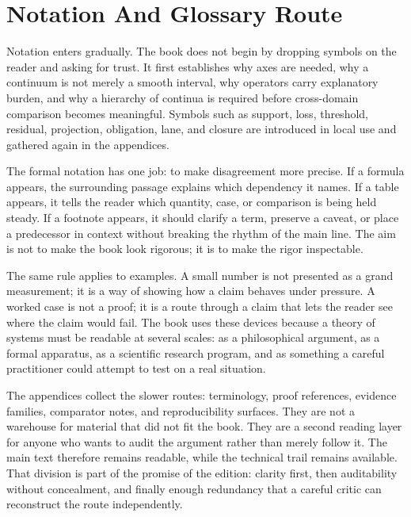 \documentclass[11pt,a4paper,openany]{book}
\begin{document}
\section*{Notation And Glossary Route}
Notation enters gradually. The book does not begin by dropping symbols on the reader and asking for trust. It first establishes why axes are needed, why a continuum is not merely a smooth interval, why operators carry explanatory burden, and why a hierarchy of continua is required before cross-domain comparison becomes meaningful. Symbols such as support, loss, threshold, residual, projection, obligation, lane, and closure are introduced in local use and gathered again in the appendices.\par
The formal notation has one job: to make disagreement more precise. If a formula appears, the surrounding passage explains which dependency it names. If a table appears, it tells the reader which quantity, case, or comparison is being held steady. If a footnote appears, it should clarify a term, preserve a caveat, or place a predecessor in context without breaking the rhythm of the main line. The aim is not to make the book look rigorous; it is to make the rigor inspectable.\par
The same rule applies to examples. A small number is not presented as a grand measurement; it is a way of showing how a claim behaves under pressure. A worked case is not a proof; it is a route through a claim that lets the reader see where the claim would fail. The book uses these devices because a theory of systems must be readable at several scales: as a philosophical argument, as a formal apparatus, as a scientific research program, and as something a careful practitioner could attempt to test on a real situation.\par
The appendices collect the slower routes: terminology, proof references, evidence families, comparator notes, and reproducibility surfaces. They are not a warehouse for material that did not fit the book. They are a second reading layer for anyone who wants to audit the argument rather than merely follow it. The main text therefore remains readable, while the technical trail remains available. That division is part of the promise of the edition: clarity first, then auditability without concealment, and finally enough redundancy that a careful critic can reconstruct the route independently.\par
\tableofcontents
\renewcommand{\listfigurename}{List of Figures.}
\listoffigures
\renewcommand{\listtablename}{List of Tables.}
\listoftables
\clearpage
\mainmatter
\end{document}
